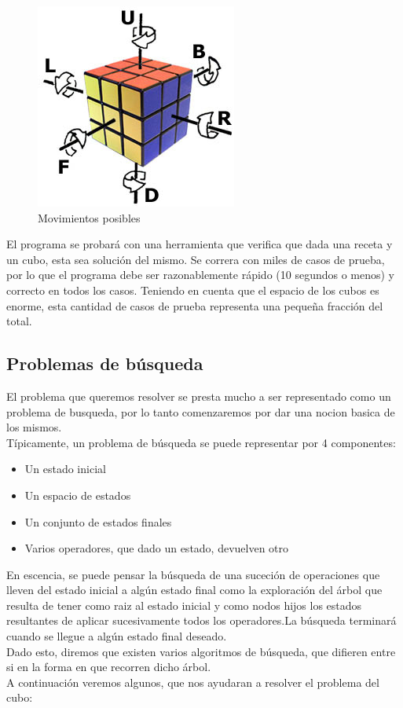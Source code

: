 \documentclass[11pt,a4paper]{article}
\begin{document}
\begin{figure}
  \centering
    \includegraphics{img/giros}
  \caption{Movimientos posibles}
  \label{fig:ejemplo}
\end{figure}

El programa se probará con una herramienta que verifica que dada una receta y un cubo, esta sea solución del mismo. Se correra con miles de casos de prueba, por lo que el programa debe ser razonablemente rápido (10 segundos o menos) y correcto en todos los casos. Teniendo en cuenta que el espacio de los cubos es enorme, esta cantidad de casos de prueba representa una pequeña fracción del total.


\subsection{Problemas de búsqueda}
El problema que queremos resolver se presta mucho a ser representado como un problema de busqueda, por lo tanto comenzaremos por dar una nocion basica de los mismos. \\
Típicamente, un problema de búsqueda se puede representar por 4 componentes:
\begin{itemize}
\item Un estado inicial
\item Un espacio de estados
\item Un conjunto de estados finales 
\item Varios operadores, que dado un estado, devuelven otro
\end{itemize}
En escencia, se puede pensar la búsqueda de una suceción de operaciones que lleven del estado inicial a algún estado final como la exploración del árbol que resulta de tener como raiz al estado inicial y como nodos hijos los estados resultantes de aplicar sucesivamente todos los operadores.La búsqueda terminará cuando se llegue a algún estado final deseado.\\
Dado esto, diremos que existen varios algoritmos de búsqueda, que difieren entre si en la forma en que recorren dicho árbol.\\
A continuación veremos algunos, que nos ayudaran a resolver el problema del cubo:
\end{document}
